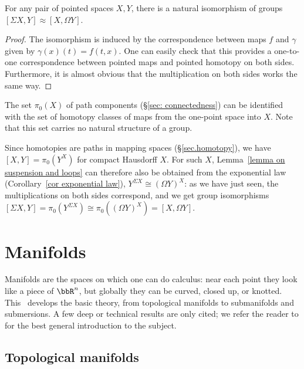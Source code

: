 \begin{lem}\label{lemma on suspension and loops}
    For any pair of pointed spaces $X,Y$, there is a natural isomorphism of groups $[\Sigma X,Y]\approx [X,\Omega Y]$.
\end{lem}
\begin{proof}
    The isomorphism is induced by the correspondence between maps $f$ and $\gamma$ given by $\gamma(x)(t)=f(t,x)$. One can easily check that this provides a one-to-one correspondence between pointed maps and pointed homotopy on both sides. Furthermore, it is almost obvious that the multiplication on both sides works the same way.
\end{proof}

\begin{rem}
    The set $\pi_0(X)$ of path components (\S\ref{sec: connectedness}) can be identified with the set of homotopy classes of maps from the one-point space into $X$. Note that this set carries no natural structure of a group.
\end{rem}

\begin{rem}
    Since homotopies are paths in mapping spaces (\S\ref{sec.homotopy}), we have $[X,Y]=\pi_0(Y^X)$ for compact Hausdorff $X$. For such $X$, Lemma~\ref{lemma on suspension and loops} can therefore also be obtained from the exponential law (Corollary~\ref{cor exponential law}), $Y^{\Sigma X}\cong (\Omega Y)^X$: as we have just seen, the multiplications on both sides correspond, and we get group isomorphisms $[\Sigma X,Y]= \pi_0(Y^{\Sigma X})\cong \pi_0((\Omega Y)^X)= [X,\Omega Y]$.
\end{rem}


\clearpage

\chapter{Manifolds}\label{ch manifolds}

Manifolds are the spaces on which one can do calculus: near each point they look like a piece of $\bbR^n$, but globally they can be curved, closed up, or knotted. This \chap\ develops the basic theory, from topological manifolds to submanifolds and submersions. A few deep or technical results are only cited; we refer the reader to \cite{Lee} for the best general introduction to the subject.

\section{Topological manifolds}\label{sec topological manifolds}


